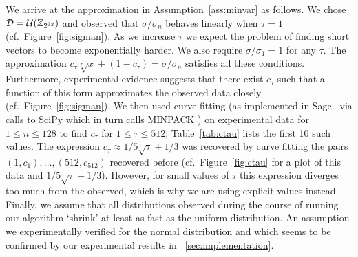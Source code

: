 We arrive at the approximation in Assumption~\ref{ass:minvar} as follows. We chose $\mathcal{D} = \mathcal{U}(\mathbb{Z}_{2^{32}})$ and observed that $\sigma/\sigma_n$ behaves linearly when $\tau=1$ (cf.\ Figure~\ref{fig:sigman}). As we increase $\tau$ we expect the problem of finding short vectors to become exponentially harder. We also require $\sigma/\sigma_1 = 1$ for any $\tau$. The approximation $c_\tau \sqrt[\tau]{x} + (1 - c_\tau) = \sigma/\sigma_n$ satisfies all these conditions. Furthermore, experimental evidence suggests that there exist $c_\tau$ such that a function of this form approximates the observed data closely (cf.\ Figure~\ref{fig:sigman}). We then used curve fitting (as implemented in Sage~\cite{sagemath} via calls to SciPy \cite{scipy} which in turn calls MINPACK \cite{minpack}) on experimental data for $1 \leq n \leq 128$  to find $c_\tau$ for $1 \leq \tau \leq 512$; Table~\ref{tab:ctau} lists the first 10 such values. The expression $c_\tau \approx 1/5\sqrt{\tau} + 1/3$ was recovered by curve fitting the pairs $(1,c_1),\dots,(512,c_{512})$ recovered before (cf.\ Figure~\ref{fig:ctau} for a plot of this data and $1/5\sqrt{\tau}+1/3$). However, for small values of $\tau$ this expression diverges too much from the observed, which is why we are using explicit values instead. Finally, we assume that all distributions observed during the course of running our algorithm `shrink' at least as fast as the uniform distribution. An assumption we experimentally verified for the normal distribution and which seems to be confirmed by our experimental results in ~\ref{sec:implementation}.

